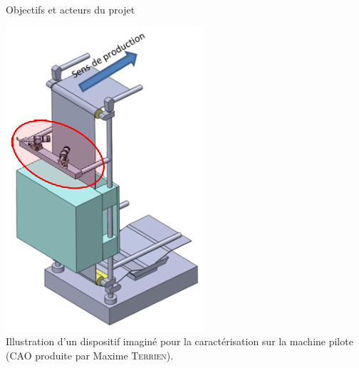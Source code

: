 \documentclass[8pt]{beamer}
\begin{document}
\begin{frame}{Objectifs et acteurs du projet}
\begin{minipage}[c]{.30\textwidth}
\begin{center}
				\includegraphics[width=\textwidth]{dispositif3D_bis.eps}
				\\Illustration d'un dispositif imaginé pour la caractérisation sur la machine pilote (CAO produite par Maxime \textsc{Terrien}).
			\end{center}
		\end{minipage}
	\end{frame}
\end{document}
